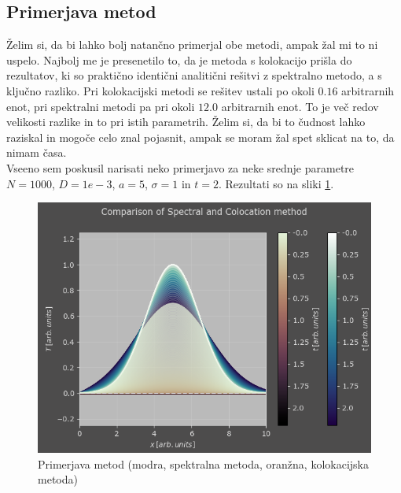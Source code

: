\documentclass[a4paper]{article}
\begin{document}
\subsection{Primerjava metod}
Želim si, da bi lahko bolj natančno primerjal obe metodi, ampak žal mi to ni uspelo. Najbolj me je presenetilo to,
da je metoda s kolokacijo prišla do rezultatov, ki so praktično identični analitični rešitvi z spektralno metodo, a
s ključno razliko. Pri kolokacijski metodi se rešitev ustali po okoli $0.16$ arbitrarnih enot, pri spektralni metodi
pa pri okoli $12.0$ arbitrarnih enot. To je več redov velikosti razlike in to pri istih parametrih. Želim si, da bi
to čudnost lahko raziskal in mogoče celo znal pojasnit, ampak se moram žal spet sklicat na to, da nimam časa.\\

Vseeno sem poskusil narisati neko primerjavo za neke srednje parametre $N=1000$, $D=1e-3$, $a=5$, $\sigma=1$ in $t=2$.
Rezultati so na sliki \ref{fig:9}.

\begin{figure}[H]
    \centering
        \includegraphics[width=\linewidth]{./images/Comparison.png}
        \caption{Primerjava metod (modra, spektralna metoda, oranžna, kolokacijska metoda)}
    \label{fig:9}
\end{figure}
\end{document}
